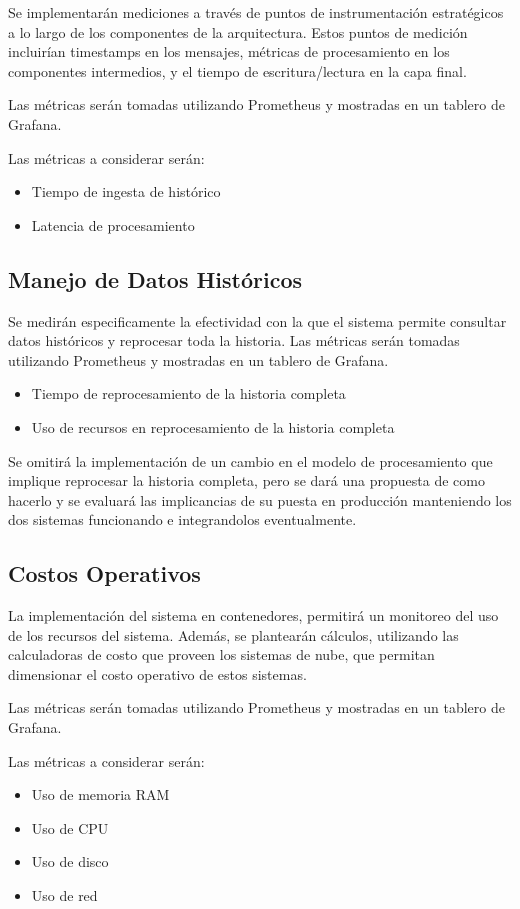 Se implementarán mediciones a través de puntos de instrumentación estratégicos a lo largo de los componentes de la arquitectura.  
Estos puntos de medición incluirían timestamps en los mensajes, métricas de procesamiento en los componentes intermedios, y el tiempo de escritura/lectura en la capa final. \newline

Las métricas serán tomadas utilizando Prometheus y mostradas en un tablero de Grafana.\newline

Las métricas a considerar serán:
\begin{itemize}
    \item Tiempo de ingesta de histórico
    \item Latencia de procesamiento
\end{itemize}

\subsection{Manejo de Datos Históricos}

Se medirán especificamente la efectividad con la que el sistema permite consultar datos históricos y reprocesar toda la historia.
Las métricas serán tomadas utilizando Prometheus y mostradas en un tablero de Grafana.

\begin{itemize}
    \item Tiempo de reprocesamiento de la historia completa
    \item Uso de recursos en reprocesamiento de la historia completa
\end{itemize}

Se omitirá la implementación de un cambio en el modelo de procesamiento que implique reprocesar la historia completa, 
pero se dará una propuesta de como hacerlo y se evaluará las implicancias de su puesta en producción manteniendo los dos sistemas funcionando e integrandolos eventualmente.

\newpage

\subsection{Costos Operativos}

La implementación del sistema en contenedores, permitirá un monitoreo del uso de los recursos del sistema.
Además, se plantearán cálculos, utilizando las calculadoras de costo que proveen los sistemas de nube, que permitan dimensionar el costo operativo de estos sistemas.\newline

Las métricas serán tomadas utilizando Prometheus y mostradas en un tablero de Grafana.\newline

Las métricas a considerar serán:
\begin{itemize}
    \item Uso de memoria RAM
    \item Uso de CPU
    \item Uso de disco
    \item Uso de red
\end{itemize}

\newpage